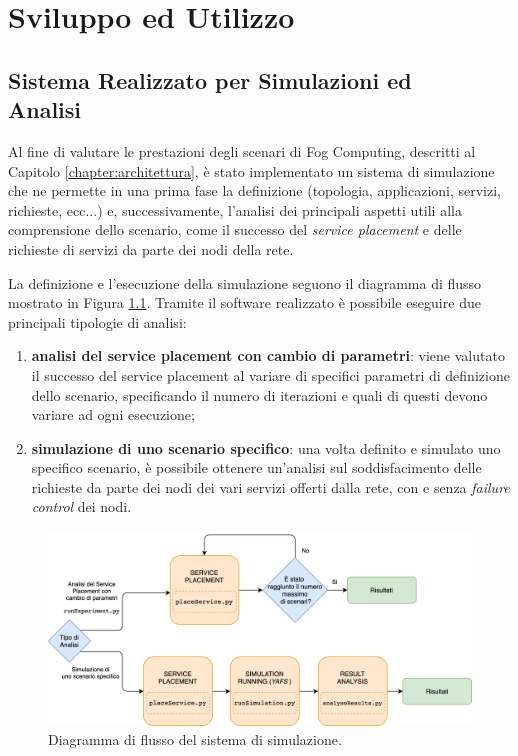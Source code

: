 \chapter{Sviluppo ed Utilizzo}
\label{chapter:implementazione}

\section[Sistema Realizzato per Simulazioni ed Analisi]{Sistema Realizzato per Simulazioni ed\\ Analisi}
\label{section:sistema_analisi}

Al fine di valutare le prestazioni degli scenari di Fog Computing, descritti al Capitolo \ref{chapter:architettura}, è stato implementato un sistema di simulazione che ne permette in una prima fase la definizione (topologia, applicazioni, servizi, richieste, ecc...) e, successivamente, l'analisi dei principali aspetti utili alla comprensione dello scenario, come il successo del \textit{service placement} e delle richieste di servizi da parte dei nodi della rete.

La definizione e l'esecuzione della simulazione seguono il diagramma di flusso mostrato in Figura \ref{fig:sim_flow_diagram}. Tramite il software realizzato è possibile eseguire due principali tipologie di analisi:
\begin{enumerate}
	\item \textbf{analisi del service placement con cambio di parametri}: viene valutato il successo del service placement al variare di specifici parametri di definizione dello scenario, specificando il numero di iterazioni e quali di questi devono variare ad ogni esecuzione;
	\item \textbf{simulazione di uno scenario specifico}: una volta definito e simulato uno specifico scenario, è possibile ottenere un'analisi sul soddisfacimento delle richieste da parte dei nodi dei vari servizi offerti dalla rete, con e senza \textit{failure control} dei nodi.
\end{enumerate}


\begin{figure}[!ht]
  \includegraphics[width=14cm]{images/sim_flow_diagram}
  \centering
  \caption{Diagramma di flusso del sistema di simulazione.}
  \label{fig:sim_flow_diagram}
\end{figure}

